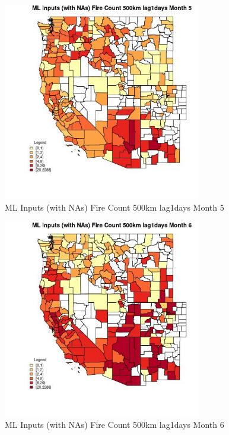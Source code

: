 \begin{figure} 
\centering  
\includegraphics[width=0.77\textwidth]{Code_Outputs/Report_ML_input_PM25_Step4_part_e_de_duplicated_aves_compiled_2019-05-20wNAs_CountyFire_Count_500km_lag1daysmedianMonth5.jpg} 
\caption{\label{fig:Report_ML_input_PM25_Step4_part_e_de_duplicated_aves_compiled_2019-05-20wNAsCountyFire_Count_500km_lag1daysmedianMonth5}ML Inputs (with NAs) Fire Count 500km lag1days Month 5} 
\end{figure} 
 

\begin{figure} 
\centering  
\includegraphics[width=0.77\textwidth]{Code_Outputs/Report_ML_input_PM25_Step4_part_e_de_duplicated_aves_compiled_2019-05-20wNAs_CountyFire_Count_500km_lag1daysmedianMonth6.jpg} 
\caption{\label{fig:Report_ML_input_PM25_Step4_part_e_de_duplicated_aves_compiled_2019-05-20wNAsCountyFire_Count_500km_lag1daysmedianMonth6}ML Inputs (with NAs) Fire Count 500km lag1days Month 6} 
\end{figure} 
 

